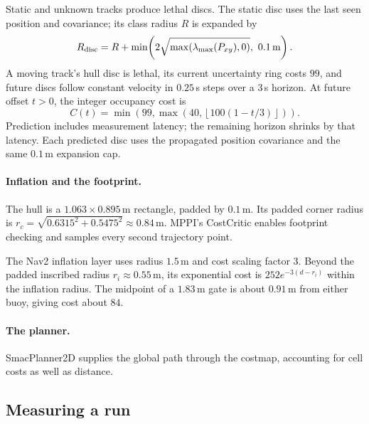 Static and unknown tracks produce lethal discs. The static disc uses the last
seen position and covariance; its class radius $R$ is expanded by
\[
 R_{\rm disc}=R+\min\!\left(2\sqrt{\max(\lambda_{\max}(P_{xy}),0)},\ 0.1\,\mathrm m\right).
\]
A moving track's hull disc is lethal, its current uncertainty ring costs $99$,
and future discs follow constant velocity in $0.25$\,s steps over a $3$\,s
horizon. At future offset $t>0$, the integer occupancy cost is
\[
 C(t)=\min\!\left(99,\max\!\left(40,\left\lfloor100(1-t/3)\right\rfloor\right)\right).
\]
Prediction includes measurement latency; the remaining horizon shrinks by that
latency. Each predicted disc uses the propagated position covariance and the
same $0.1$\,m expansion cap.

\paragraph{Inflation and the footprint.} The hull is a $1.063\times0.895$\,m
rectangle, padded by
$0.1$\,m. Its padded corner radius is
$r_c=\sqrt{0.6315^2+0.5475^2}\approx0.84$\,m. MPPI's CostCritic enables
footprint checking and samples every second trajectory point.

The Nav2 inflation layer uses radius $1.5$\,m and cost scaling factor $3$.
Beyond the padded inscribed radius $r_i\approx0.55$\,m, its exponential cost
is $252e^{-3(d-r_i)}$ within the inflation radius. The midpoint of a
$1.83$\,m gate is about $0.91$\,m from either buoy, giving cost about $84$.

\paragraph{The planner.} SmacPlanner2D supplies the global path through the
costmap, accounting for cell costs as well as distance.

\subsection{Measuring a run}


